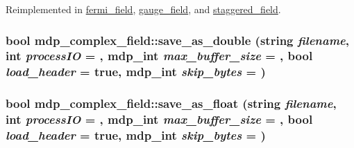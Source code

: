 Reimplemented in \hyperlink{classfermi__field_abfaaf9b43f054fde18eaef3d80b1edf4}{fermi\_\-field}, \hyperlink{classgauge__field_a1006054965a512e4dd06ca8c0b5c5d28}{gauge\_\-field}, and \hyperlink{classstaggered__field_a5320371c9d4b87255c578e5b41684e48}{staggered\_\-field}.\hypertarget{classmdp__complex__field_aa6357291a82fe4209f7b3a7ecce3ca78}{
\subsubsection[{save\_\-as\_\-double}]{\setlength{\rightskip}{0pt plus 5cm}bool mdp\_\-complex\_\-field::save\_\-as\_\-double (string {\em filename}, \/  int {\em processIO} = {}, \/  {\bf mdp\_\-int} {\em max\_\-buffer\_\-size} = {}, \/  bool {\em load\_\-header} = {\ttfamily true}, \/  {\bf mdp\_\-int} {\em skip\_\-bytes} = {})}}
\label{classmdp__complex__field_aa6357291a82fe4209f7b3a7ecce3ca78}
\hypertarget{classmdp__complex__field_a27b6db7d432105f65b42c970ea340482}{
\subsubsection[{save\_\-as\_\-float}]{\setlength{\rightskip}{0pt plus 5cm}bool mdp\_\-complex\_\-field::save\_\-as\_\-float (string {\em filename}, \/  int {\em processIO} = {}, \/  {\bf mdp\_\-int} {\em max\_\-buffer\_\-size} = {}, \/  bool {\em load\_\-header} = {\ttfamily true}, \/  {\bf mdp\_\-int} {\em skip\_\-bytes} = {})}}
\label{classmdp__complex__field_a27b6db7d432105f65b42c970ea340482}


